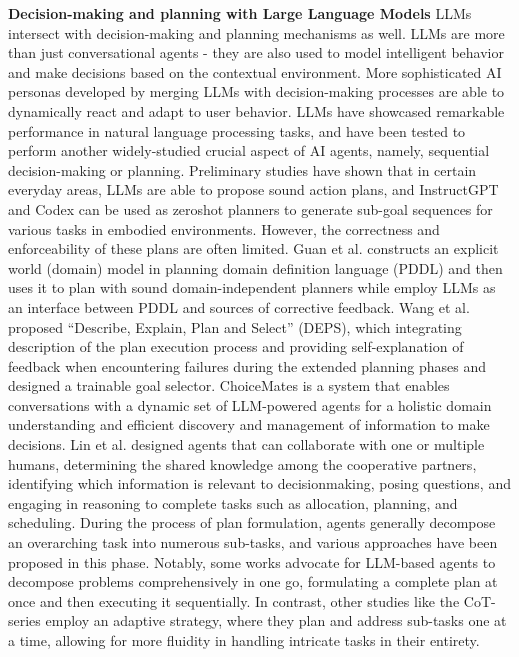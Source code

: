 \textbf{Decision-making and planning with Large Language Models}\quad
LLMs intersect with decision-making and planning mechanisms as well. 
LLMs are more than just conversational agents - they are also used to model intelligent behavior and make decisions based on the contextual environment. 
More sophisticated AI personas developed by merging LLMs with decision-making processes are able to dynamically react and adapt to user behavior. 
LLMs have showcased remarkable performance in natural language processing tasks, and have been tested to perform another widely-studied crucial aspect of AI agents, namely, sequential decision-making or planning.
Preliminary studies have shown that in certain everyday areas, LLMs are able to propose sound action plans\cite{ahn2022can, huang2022language}, and 
InstructGPT\cite{ouyang2022training} and Codex\cite{chen2021evaluating} can be used as zeroshot planners to generate sub-goal sequences for various tasks in embodied environments.
However, the correctness and enforceability of these plans are often limited. 
Guan et al.\cite{guan_leveraging_2023} constructs an explicit world (domain) model in planning domain definition language (PDDL) and then uses it to plan with sound domain-independent planners while employ LLMs as an interface between PDDL and sources of corrective feedback.
Wang et al.\cite{wang_describe_2023} proposed “Describe, Explain, Plan and Select” (DEPS), which integrating description of the plan execution process and providing self-explanation of feedback when encountering failures during the extended planning phases and designed a trainable goal selector.
ChoiceMates\cite{park_choicemates_2023} is a system that enables conversations with a dynamic set of LLM-powered agents for a holistic domain understanding and efficient discovery and management of information to make decisions.
Lin et al.\cite{lin2023decision} designed agents that can collaborate with one or multiple humans, determining the shared knowledge among the cooperative partners, identifying which information is relevant to decisionmaking, posing questions, and engaging in reasoning to complete tasks such as allocation, planning, and scheduling.
During the process of plan formulation, agents generally decompose an overarching task into numerous sub-tasks, and various approaches have been proposed in this phase. Notably, some works advocate for LLM-based agents to decompose problems comprehensively in one go, formulating a complete plan at once and then executing it sequentially\cite{zhou2022least}. 
In contrast, other studies like the CoT-series employ an adaptive strategy, where they plan and address sub-tasks one at a time, allowing for more fluidity in handling intricate tasks in their entirety\cite{wei2022chain}.

